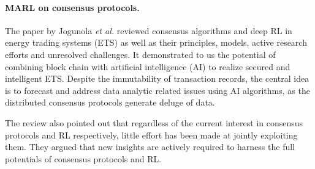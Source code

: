 \documentclass[a4paper,11pt]{article}
\begin{document}
\paragraph{MARL on consensus protocols.}
The paper \cite{Jogunola-ieee2021} by Jogunola \emph{et al.} reviewed consensus algorithms and deep RL in energy trading systems (ETS) as well as their principles, models, active research efforts and unresolved challenges.
It demonstrated to us the potential of combining block chain with artificial intelligence (AI) to realize secured and intelligent ETS. Despite the immutability of transaction records, the central idea is to forecast and address data analytic related issues using AI algorithms, as the distributed consensus protocols generate deluge of data.  

The review also pointed out that regardless of the current interest in consensus protocols and RL respectively, little effort has been made at jointly exploiting them. They argued that new insights are actively required to harness the full potentials of consensus protocols and RL.
\end{document}
